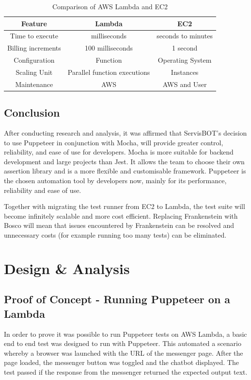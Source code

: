 \documentclass[12pt,a4paper,titlepage]{report}
\begin{document}
\begin{table}[ht]
  \centering
  \small
  \setlength\tabcolsep{6pt}
  \begin{tabular}{|c|c|c|}
   \hline
   \textbf{Feature} & \textbf{Lambda} & \textbf{EC2}\\
   \hline\hline
   Time to execute&milliseconds&seconds to minutes\\
   \hline
   Billing increments& 100 milliseconds&1 second\\
   \hline
   Configuration&Function& Operating System\\
   \hline
   Scaling Unit&Parallel function executions&Instances\\
   \hline
   Maintenance& AWS&AWS and User\\
   \hline
  \end{tabular}
  \caption{Comparison of AWS Lambda and EC2 \autocite{inbook}}
 \end{table}

\section{Conclusion}
After conducting research and analysis, it was affirmed that ServisBOT's decision to use Puppeteer in conjunction 
with Mocha, will provide greater control, reliability, and ease of use for developers. Mocha is more suitable for backend development and large projects than Jest. 
It allows the team to choose their own assertion library and is a more flexible and customisable framework.
Puppeteer is the chosen automation tool by developers now, mainly for its performance, reliability and ease of use.

Together with migrating the test runner from EC2 to Lambda, the test suite will become infinitely scalable and 
more cost efficient. Replacing Frankenstein with Bosco will mean that issues encountered by Frankenstein can be resolved and unnecessary costs (for 
example running too many tests) can be eliminated.

\chapter{Design \& Analysis}

\section{Proof of Concept - Running Puppeteer on a Lambda}

In order to prove it was possible to run Puppeteer tests on AWS Lambda, a basic end to end test was designed
to run with Puppeteer. This automated a scenario whereby a browser was launched with the URL of the
messenger page. After the page loaded, the messenger button was toggled and the chatbot displayed. The test
passed if the response from the messenger returned the expected output text.
\end{document}
